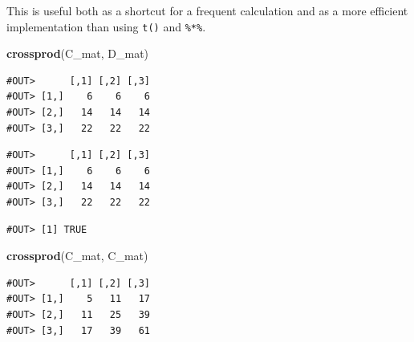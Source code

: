 \documentclass[]{book}
\newenvironment{Shaded}{\begin{snugshade}}{\end{snugshade}}
\newcommand{\KeywordTok}[1]{\textcolor[rgb]{0.13,0.29,0.53}{\textbf{#1}}}
\newcommand{\StringTok}[1]{\textcolor[rgb]{0.31,0.60,0.02}{#1}}
\newcommand{\OperatorTok}[1]{\textcolor[rgb]{0.81,0.36,0.00}{\textbf{#1}}}
\newcommand{\NormalTok}[1]{#1}
\theoremstyle{definition}
\theoremstyle{definition}
\theoremstyle{definition}
\theoremstyle{remark}
\begin{document}
This is useful both as a shortcut for a frequent calculation and as a
more efficient implementation than using \texttt{t()} and
\texttt{\%*\%}.

\begin{Shaded}
\begin{Highlighting}[]
\KeywordTok{crossprod}\NormalTok{(C_mat, D_mat)}
\end{Highlighting}
\end{Shaded}

\begin{verbatim}
#OUT>      [,1] [,2] [,3]
#OUT> [1,]    6    6    6
#OUT> [2,]   14   14   14
#OUT> [3,]   22   22   22
\end{verbatim}

\begin{Shaded}
\end{Shaded}

\begin{verbatim}
#OUT>      [,1] [,2] [,3]
#OUT> [1,]    6    6    6
#OUT> [2,]   14   14   14
#OUT> [3,]   22   22   22
\end{verbatim}

\begin{Shaded}
\end{Shaded}

\begin{verbatim}
#OUT> [1] TRUE
\end{verbatim}

\begin{Shaded}
\begin{Highlighting}[]
\KeywordTok{crossprod}\NormalTok{(C_mat, C_mat)}
\end{Highlighting}
\end{Shaded}

\begin{verbatim}
#OUT>      [,1] [,2] [,3]
#OUT> [1,]    5   11   17
#OUT> [2,]   11   25   39
#OUT> [3,]   17   39   61
\end{verbatim}

\begin{Shaded}
\end{Shaded}
\end{document}
